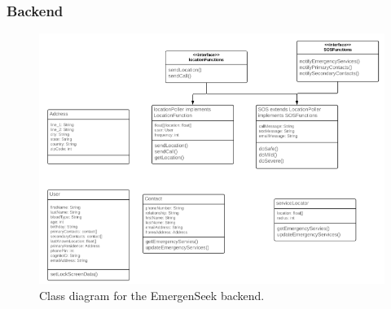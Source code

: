 \documentclass[10pt, a4paper]{article}
\begin{document}
\subsubsection{Backend}
\begin{figure}[H]
\begin{center}
\centerline{
	\includegraphics[scale=1]{final-diagrams/backend-class.PNG}
}
\caption{Class diagram for the EmergenSeek backend.}
\end{center}	
\end{figure}
\end{document}

